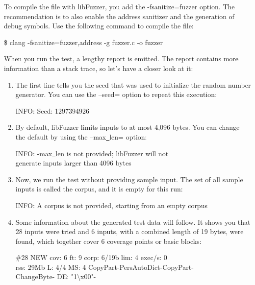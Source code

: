 To compile the file with libFuzzer, you add the -fsanitize=fuzzer option. The recommendation is to also enable the address sanitizer and the generation of debug symbols. Use the following command to compile the file:\par

\begin{tcolorbox}[colback=white,colframe=black]
\$ clang -fsanitize=fuzzer,address -g fuzzer.c -o fuzzer
\end{tcolorbox}

When you run the test, a lengthy report is emitted. The report contains more information than a stack trace, so let's have a closer look at it:\par

\begin{enumerate}
\item The first line tells you the seed that was used to initialize the random number generator. You can use the –seed= option to repeat this execution:
\begin{tcolorbox}[colback=white,colframe=black]
INFO: Seed: 1297394926
\end{tcolorbox}

\item By default, libFuzzer limits inputs to at most 4,096 bytes. You can change the default by using the –max\underline{~}len= option:
\begin{tcolorbox}[colback=white,colframe=black]
INFO: -max\underline{~}len is not provided; libFuzzer will not \\
generate inputs larger than 4096 bytes
\end{tcolorbox}

\item Now, we run the test without providing sample input. The set of all sample inputs is called the corpus, and it is empty for this run:
\begin{tcolorbox}[colback=white,colframe=black]
INFO: A corpus is not provided, starting from an empty corpus
\end{tcolorbox}

\item Some information about the generated test data will follow. It shows you that 28 inputs were tried and 6 inputs, with a combined length of 19 bytes, were found, which together cover 6 coverage points or basic blocks:
\begin{tcolorbox}[colback=white,colframe=black]
\#28 NEW cov: 6 ft: 9 corp: 6/19b lim: 4 exec/s: 0 \\
rss: 29Mb L: 4/4 MS: 4 CopyPart-PersAutoDict-CopyPart- \\
ChangeByte- DE: "1$\setminus$x00"-
\end{tcolorbox}


\end{enumerate}
